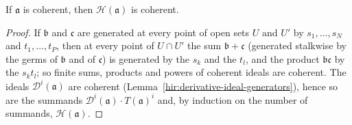 \begin{lemma}
\label{mc:homogenized-coherent}
\leanok
If \(\mathfrak a\) is coherent, then \(\mathcal H(\mathfrak a)\) is coherent.
\end{lemma}
\begin{proof}
\leanok
If \(\mathfrak b\) and \(\mathfrak c\) are generated at every point of open sets \(U\) and \(U'\) by \(s_1,\dots,s_N\) and \(t_1,\dots,t_P\), then at every point
of \(U\cap U'\) the sum \(\mathfrak b+\mathfrak c\) (generated stalkwise by the germs of \(\mathfrak b\) and of \(\mathfrak c\)) is generated by the \(s_k\) and the
\(t_l\), and the product \(\mathfrak b\mathfrak c\) by the \(s_kt_l\); so finite sums, products and powers of coherent ideals are coherent. The ideals
\(\mathcal D^i(\mathfrak a)\) are coherent (Lemma~\ref{hir:derivative-ideal-generators}), hence so are the summands \(\mathcal D^i(\mathfrak a)\cdot T(\mathfrak a)^i\) and,
by induction on the number of summands, \(\mathcal H(\mathfrak a)\).
\end{proof}

